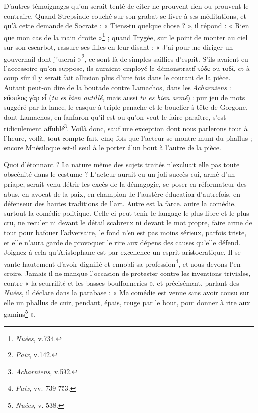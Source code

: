 \documentclass{book}%
\newcommand{\italique}[1]{\textit{#1}}%
\newcommand{\note}[1]{\footnote{#1}}
\begin{document}
D'autres témoignages qu'on serait tenté de citer ne prouvent rien ou prouvent le contraire. Quand Strepsiade couché sur son grabat se livre à ses méditations, et qu'à cette demande de Socrate : « Tiens-tu quelque chose ? », il répond : « Rien que mon cas de la main droite »\note{\italique{Nuées}, v.734.} ; quand Trygée, sur le point de monter au ciel sur son escarbot, rassure ses filles en leur disant : « J'ai pour me diriger un gouvernail dont j'userai »\note{\italique{Paix}, v.142.}, ce sont là de simples saillies d'esprit. S'ils avaient eu l'accessoire qu'on suppose, ils auraient employé le démonstratif τόδε ou τοδί, et à coup sûr il y serait fait allusion plus d'une fois dans le courant de la pièce. Autant peut-on dire de la boutade contre Lamachos, dans les \italique{Acharniens} : εὔοπλος γὰρ εἶ (\italique{tu es bien outillé}, mais aussi \italique{tu es bien armé}) : pur jeu de mots suggéré par la lance, le casque à triple panache et le bouclier à tête de Gorgone, dont Lamachos, en fanfaron qu'il est ou qu'on veut le faire paraître, s'est ridiculement affublé\note{\italique{Acharniens}, v.592.}. Voilà donc, sauf une exception dont nous parlerons tout à l'heure, voilà, tout compte fait, cinq fois que l'acteur se montre muni du phallus ; encore Mnésiloque est-il seul à le porter d'un bout à l'autre de la pièce.

Quoi d'étonnant ? La nature même des sujets traités n'excluait elle pas toute obscénité dans le costume ? L'acteur aurait eu un joli succès qui, armé d'un priape, serait venu flétrir les excès de la démagogie, se poser en réformateur des abus, en avocat de la paix, en champion de l'austère éducation d'autrefois, en défenseur des hautes traditions de l'art. Autre est la farce, autre la comédie, surtout la comédie politique. Celle-ci peut tenir le langage le plus libre et le plus cru, ne reculer ni devant le détail scabreux ni devant le mot propre, faire arme de tout pour bafouer l'adversaire, le fond n'en est pas moins sérieux, parfois triste, et elle n'aura garde de provoquer le rire aux dépens des causes qu'elle défend. Joignez à cela qu'Aristophane est par excellence un esprit aristocratique. Il se vante hautement d'avoir dignifié et ennobli sa profession\note{\italique{Paix}, vv. 739-753.}, et nous devons l'en croire. Jamais il ne manque l'occasion de protester contre les inventions triviales, contre « la scurrilité et les basses bouffonneries », et précisément, parlant des \italique{Nuées}, il déclare dans la parabase : « Ma comédie est venue sans avoir cousu sur elle un phallus de cuir, pendant, épais, rouge par le bout, pour donner à rire aux gamins\note{\italique{Nuées}, v. 538.} ». 
\end{document}
